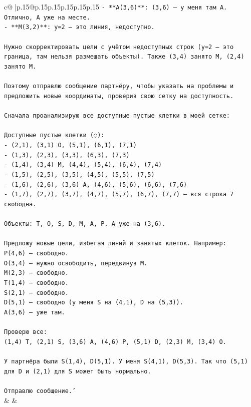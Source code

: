 \documentclass{article}
\begin{document}
{\begin{supertabular}{c@{$\;$}|p{.15\linewidth}@{}p{.15\linewidth}p{.15\linewidth}p{.15\linewidth}p{.15\linewidth}p{.15\linewidth}}
{{{\texttt{{-} **A(3,6)**: (3,6) — у меня там A. Отлично, A уже на месте.} \\
\texttt{{-} **M(3,2)**: y=2 — это линия, недоступно.} \\
\\ 
\texttt{Нужно скорректировать цели с учётом недоступных строк (y=2 — это граница, там нельзя размещать объекты). Также (3,4) занято M, (2,4) занято M.} \\
\\ 
\texttt{Поэтому отправлю сообщение партнёру, чтобы указать на проблемы и предложить новые координаты, проверив свою сетку на доступность.} \\
\\ 
\texttt{Сначала проанализирую все доступные пустые клетки в моей сетке:} \\
\\ 
\texttt{Доступные пустые клетки (◌):} \\
\texttt{{-} (2,1), (3,1) O, (5,1), (6,1), (7,1)} \\
\texttt{{-} (1,3), (2,3), (3,3), (6,3), (7,3)} \\
\texttt{{-} (1,4), (3,4) M, (4,4), (5,4), (6,4), (7,4)} \\
\texttt{{-} (1,5), (2,5), (3,5), (4,5), (5,5), (7,5)} \\
\texttt{{-} (1,6), (2,6), (3,6) A, (4,6), (5,6), (6,6), (7,6)} \\
\texttt{{-} (1,7), (2,7), (3,7), (4,7), (5,7), (6,7), (7,7) — вся строка 7 свободна.} \\
\\ 
\texttt{Объекты: T, O, S, D, M, A, P. A уже на (3,6).} \\
\\ 
\texttt{Предложу новые цели, избегая линий и занятых клеток. Например:} \\
\texttt{P(4,6) — свободно.} \\
\texttt{O(3,4) — нужно освободить, передвинув M.} \\
\texttt{M(2,3) — свободно.} \\
\texttt{T(1,4) — свободно.} \\
\texttt{S(2,1) — свободно.} \\
\texttt{D(5,1) — свободно (у меня S на (4,1), D на (5,3)).} \\
\texttt{A(3,6) — уже там.} \\
\\ 
\texttt{Проверю все:} \\
\texttt{(1,4) T, (2,1) S, (3,6) A, (4,6) P, (5,1) D, (2,3) M, (3,4) O.} \\
\\ 
\texttt{У партнёра были S(1,4), D(5,1). У меня S(4,1), D(5,3). Так что (5,1) для D и (2,1) для S может быть нормально.} \\
\\ 
\texttt{Отправлю сообщение.'} \\
            }
        }
    }
    & & \\ \\


\end{supertabular}}
\end{document}

